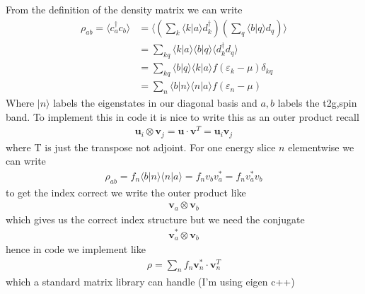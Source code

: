 \documentclass[11pt]{article}
\begin{document}
From the definition of the density matrix we can write
\begin{align}
    \rho_{ab} = \langle c_a^\dagger c_b\rangle &= \langle \left( \sum_k \langle k|a\rangle d_k^\dagger \right ) \left(\sum_q \langle b|q\rangle d_q \right) \rangle \\\nonumber
    &= \sum_{kq}\langle k|a\rangle\langle b | q\rangle \langle d_k^\dagger d_q\rangle \\\nonumber
    &= \sum_{kq} \langle b|q\rangle\langle k|a\rangle f(\varepsilon_k - \mu)\delta_{kq} \\\nonumber
    &= \sum_n \langle b|n\rangle\langle n|a\rangle f(\varepsilon_n -\mu)
\end{align}
Where $|n\rangle$ labels the eigenstates in our diagonal basis and $a,b$ labels the t2g,spin band. To implement
this in code it is nice to write this as an outer product recall
\begin{gather}
    \bm u_i \otimes \bm v_j =\bm u \cdot \bm v^T= \bm u_i \bm v_j
\end{gather}
where T is just the transpose not adjoint. For one energy slice $n$ elementwise we can write
\begin{align}
    \rho_{ab} = f_n \langle b | n \rangle \langle n | a \rangle = f_n v_b v_a^* = f_n v_a^* v_b
\end{align}
to get the index correct we write the outer product like
\begin{gather}
    \bm v_a \otimes \bm v_b
\end{gather}
which gives us the correct index structure but we need the conjugate
\begin{gather}
    \bm v_a^* \otimes \bm v_b
\end{gather}
hence in code we implement like
\begin{gather}
    \rho = \sum_n f_n \bm v_n^* \cdot \bm v_n^T
\end{gather}
which a standard matrix library can handle (I'm using eigen c++)
\end{document}
